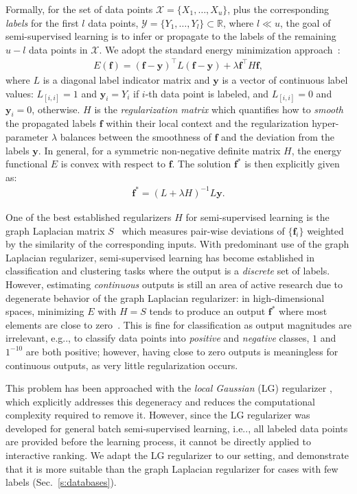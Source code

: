 \documentclass{article}
\makeatletter
\newcommand{\mbf}{\mathbf{f}}
\newcommand{\mby}{\mathbf{y}}
\newcommand{\calX}{\mathcal{X}}
\newcommand{\calY}{\mathcal{Y}}
\newcommand{\R}{\mathbb{R}}
\DeclareRobustCommand\onedot{\futurelet\@let@token\@onedot}
\def\@onedot{\ifx\@let@token.\else.\null\fi\xspace}
\def\eg{{e.g}\onedot} \def\Eg{{E.g}\onedot}
\def\ie{{i.e}\onedot} \def\Ie{{I.e}\onedot}
\makeatother
\begin{document}
Formally, for the set of data points $\calX = \{X_1,\ldots,X_u\}$, plus the corresponding \emph{labels} for the first $l$ data points, $\calY =\{Y_1,\ldots,Y_l\}\subset \R$, where $l\ll u$, the goal of semi-supervised learning is to infer or propagate to the labels of the remaining $u-l$ data points in $\calX$. We adopt the standard energy minimization approach~\cite{ZhoBouLal04,ZhuLafGha03,ChaSchZie06}:
\begin{align}
\label{e:energyreform}
E(\mbf) =(\mbf-\mby)^\top L (\mbf-\mby)+\lambda \mbf^\top H \mbf,
\end{align}
where $L$ is a diagonal label indicator matrix and $\mby$ is a vector of continuous label values: $L_{[i,i]}=1$ and $\mby_i=Y_i$ if $i$-th data point is labeled, and $L_{[i,i]}=0$ and $\mby_i=0$, otherwise. $H$ is the \emph{regularization matrix} which quantifies how to \emph{smooth} the propagated labels $\mbf$ within their local context and the regularization hyper-parameter $\lambda$ balances between the smoothness of $\mbf$ and the deviation from the labels $\mby$. In general, for a symmetric non-negative definite matrix $H$, the energy functional $E$ is convex with respect to $\mbf$. The solution $\mbf^*$ is then explicitly given as:
\begin{align}
\mbf^* =(L+\lambda H)^{-1}L \mby.
\end{align}

One of the best established regularizers $H$ for semi-supervised learning is the graph Laplacian matrix $S$~\cite{Lux07,ZhoBouLal04,ZhuLafGha03} which measures pair-wise deviations of $\{\mbf_i\}$ weighted by the similarity of the corresponding inputs. With predominant use of the graph Laplacian regularizer, semi-supervised learning has become established in classification and clustering tasks where the output is a \emph{discrete} set of labels. However, estimating \emph{continuous} outputs is still an area of active research due to degenerate behavior of the graph Laplacian regularizer: in high-dimensional spaces, minimizing $E$ with $H=S$ tends to produce an output $\mbf^*$ where most elements are close to zero~\cite{NadSreZho09}. This is fine for classification as output magnitudes are irrelevant, \eg, to classify data points into \emph{positive} and \emph{negative} classes, $1$ and $1^{-10}$ are both positive; however, having close to zero outputs is meaningless for continuous outputs, as very little regularization occurs.

This problem has been approached with the \emph{local Gaussian} (LG) regularizer \cite{KimTompkin2015}, which explicitly addresses this degeneracy and reduces the computational complexity required to remove it. However, since the LG regularizer was developed for general batch semi-supervised learning, \ie, all labeled data points are provided before the learning process, it cannot be directly applied to interactive ranking. We adapt the LG regularizer to our setting, and demonstrate that it is more suitable than the graph Laplacian regularizer for cases with few labels (Sec.~\ref{s:databases}).
\end{document}
